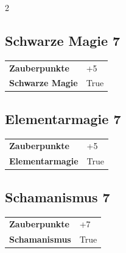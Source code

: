 \begin{multicols}{2}
\begin{tcolorbox}
\end{tcolorbox}

\begin{tcolorbox}
    \subsection*{Schwarze Magie \hfill \small{7 }}
    \tcblower




\begin{tabular}{@{}ll@{}}
    \textbf{Zauberpunkte} & +5\\
    \textbf{Schwarze Magie} & True\\
\end{tabular}


\end{tcolorbox}

\begin{tcolorbox}
    \subsection*{Elementarmagie \hfill \small{7 }}
    \tcblower




\begin{tabular}{@{}ll@{}}
    \textbf{Zauberpunkte} & +5\\
    \textbf{Elementarmagie} & True\\
\end{tabular}


\end{tcolorbox}

\begin{tcolorbox}
    \subsection*{Schamanismus \hfill \small{7 }}
    \tcblower




\begin{tabular}{@{}ll@{}}
    \textbf{Zauberpunkte} & +7\\
    \textbf{Schamanismus} & True\\
\end{tabular}


\end{tcolorbox}
\end{multicols}
